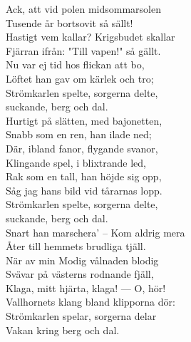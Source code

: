 \documentclass[a6paper, 10pt, twoside]{article}
\begin{document}
\begin{lyrics}
\newpage
\noindent
Ack, att vid polen midsommarsolen\\
Tusende år bortsovit så sällt!\\
Hastigt vem kallar? Krigsbudet skallar\\
Fjärran ifrån: "Till vapen!" så gällt.\\
Nu var ej tid hos flickan att bo,\\
Löftet han gav om kärlek och tro;\\
Strömkarlen spelte, sorgerna delte,\\
suckande, berg och dal.
\vspace{5pt}\\
Hurtigt på slätten, med bajonetten,\\
Snabb som en ren, han ilade ned;\\
Där, ibland fanor, flygande svanor,\\
Klingande spel, i blixtrande led,\\
Rak som en tall, han höjde sig opp,\\
Såg jag hans bild vid tårarnas lopp.\\
Strömkarlen spelte, sorgerna delte,\\
suckande, berg och dal.
\vspace{5pt}\\
Snart han marschera' -- Kom aldrig mera\\
Åter till hemmets brudliga tjäll.\\
När av min Modig vålnaden blodig\\
Svävar på västerns rodnande fjäll,\\
Klaga, mitt hjärta, klaga! — O, hör!\\
Vallhornets klang bland klipporna dör:\\
Strömkarlen spelar, sorgerna delar\\
Vakan kring berg och dal.
\end{lyrics}
\end{document}
